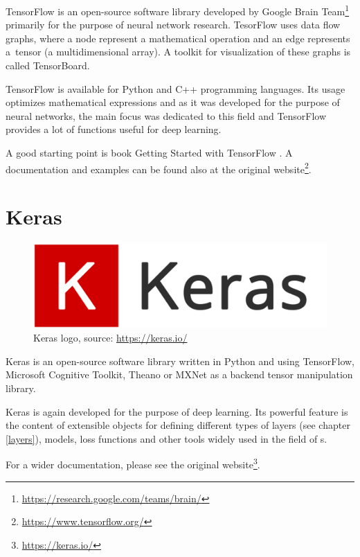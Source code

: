 TensorFlow is an open-source software library developed by Google Brain 
Team\footnote{\url{https://research.google.com/teams/brain/}} primarily for the 
purpose of neural network research. TesorFlow uses data flow graphs, where a 
node represent a mathematical operation and an edge represents a~tensor (a 
multidimensional array). A toolkit for visualization of these graphs is called 
TensorBoard.

TensorFlow is available for Python and C++ programming languages. Its usage 
optimizes mathematical expressions and as it was developed for the purpose of 
neural networks, the main focus was dedicated to this field and TensorFlow 
provides a lot of functions useful for deep learning.

A good starting point is book Getting Started with TensorFlow \cite{tf}. A 
documentation and examples can be found also at the original 
website\footnote{\url{https://www.tensorflow.org/}}.

\section{Keras}
\label{keras}

\begin{figure}[H]
   \centering
	\includegraphics[width=\linewidth]{./pictures/keras-logo.png}
	\caption[Keras logo]{Keras logo, source: \url{https://keras.io/}}
      \label{fig:keras-logo}
\end{figure}

Keras is an open-source software library written in Python and using TensorFlow, 
Microsoft Cognitive Toolkit, Theano or MXNet as a backend tensor manipulation 
library.

Keras is again developed for the purpose of deep learning. Its powerful feature 
is the content of extensible objects for defining different types of layers (see 
chapter \ref{layers}), models, loss functions and other tools widely used in the 
field of s.

For a wider documentation, please see the original 
website\footnote{\url{https://keras.io/}}.
